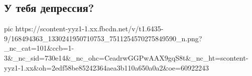  
 
 
 
 

\subsection{У тебя депрессия?}

\ifcmt
  pic https://scontent-yyz1-1.xx.fbcdn.net/v/t1.6435-9/168494363_1330241950710753_7511254570275849590_n.png?_nc_cat=101&ccb=1-3&_nc_sid=730e14&_nc_ohc=CeadrwGGPwAAX9gqS8t&_nc_ht=scontent-yyz1-1.xx&oh=2edf58be85242364aea3b110a650a0a2&oe=60922243
\fi
